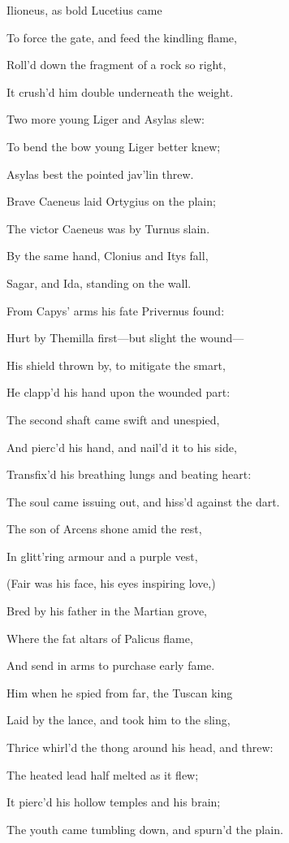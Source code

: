 Ilioneus, as bold Lucetius came

To force the gate, and feed the kindling flame,

Roll’d down the fragment of a rock so right,

It crush’d him double underneath the weight.

Two more young Liger and Asylas slew:

To bend the bow young Liger better knew;

Asylas best the pointed jav’lin threw.

Brave Caeneus laid Ortygius on the plain;

The victor Caeneus was by Turnus slain.

By the same hand, Clonius and Itys fall,

Sagar, and Ida, standing on the wall.

From Capys’ arms his fate Privernus found:

Hurt by Themilla first—but slight the wound—

His shield thrown by, to mitigate the smart,

He clapp’d his hand upon the wounded part:

The second shaft came swift and unespied,

And pierc’d his hand, and nail’d it to his side,

Transfix’d his breathing lungs and beating heart:

The soul came issuing out, and hiss’d against the dart.

The son of Arcens shone amid the rest,

In glitt’ring armour and a purple vest,

(Fair was his face, his eyes inspiring love,)

Bred by his father in the Martian grove,

Where the fat altars of Palicus flame,

And send in arms to purchase early fame.

Him when he spied from far, the Tuscan king

Laid by the lance, and took him to the sling,

Thrice whirl’d the thong around his head, and threw:

The heated lead half melted as it flew;

It pierc’d his hollow temples and his brain;

The youth came tumbling down, and spurn’d the plain.

